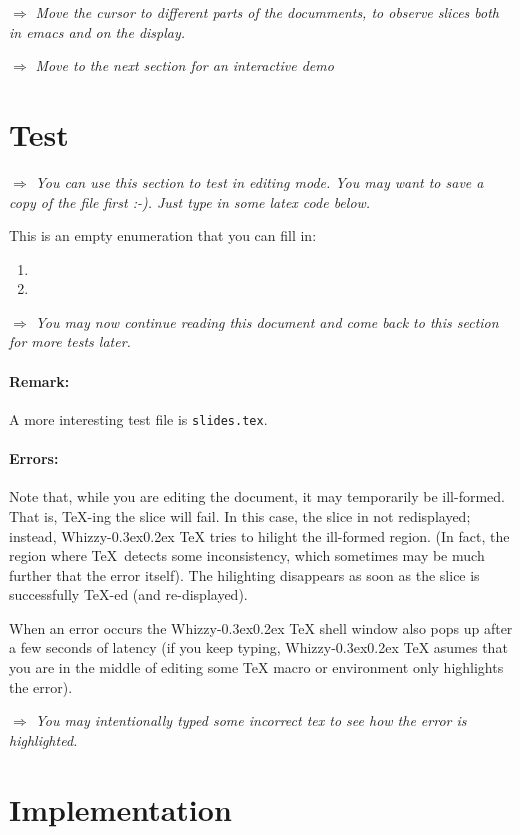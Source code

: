 \documentclass{article}
\let \lst \verb
\def \whizzy{{Whizzy\kern -0.3ex\raise 0.2ex \hbox{\TeX}}}
\def \instruction #1{\par\medskip \noindent$\Rightarrow$ {\em #1}}
\begin{document}
\instruction 
{Move the cursor to different parts of the documments, to observe 
slices both in emacs and on the display. }

\instruction {Move to the next section for an interactive demo}


\section {Test}

\instruction
{You can use this section to test in editing mode.
You may want to save a copy of the file first :-). 
Just type in some latex code below.}

This is an empty enumeration that you can fill in: 
\begin {enumerate}
\item
\item
\end {enumerate}

\instruction
{You may now continue reading this document and come back to this
section for more tests later.}

\paragraph{Remark:}
A more interesting test file is \lst"slides.tex".

\paragraph{Errors:}
Note that, while you are editing the document, it may temporarily be
ill-formed. That is, \TeX-ing the slice will fail. In this case, the slice in
not redisplayed; instead, {\whizzy} tries to hilight the ill-formed region.
(In fact, the region where \TeX\ detects some inconsistency, which sometimes
may be much further that the error itself). The hilighting disappears as
soon as the slice is successfully \TeX-ed (and re-displayed). 

When an error occurs the {\whizzy} shell window also pops up after a few
seconds of latency (if you keep typing, {\whizzy} asumes that you are in the
middle of editing some {\TeX} macro or environment only highlights the
error). 

\instruction
{You may intentionally typed some incorrect tex to see how the error is
highlighted.}


\section {Implementation}
\end{document}
